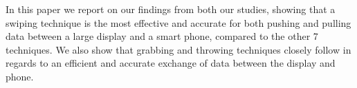 In this paper we report on our findings from both our studies, showing that a swiping technique is the most effective and accurate for both pushing and pulling data between a large display and a smart phone, compared to the other 7 techniques. 
We also show that grabbing and throwing techniques closely follow in regards to an efficient and accurate exchange of data between the display and phone. 